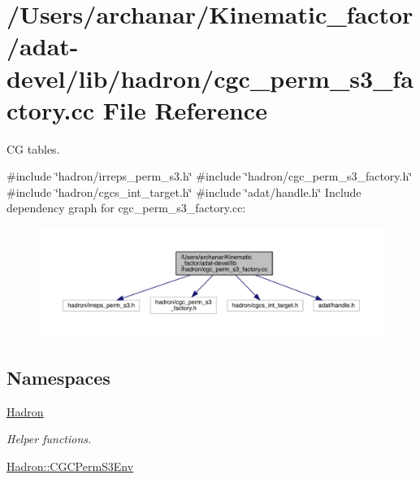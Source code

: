 \hypertarget{adat-devel_2lib_2hadron_2cgc__perm__s3__factory_8cc}{}\section{/\+Users/archanar/\+Kinematic\+\_\+factor/adat-\/devel/lib/hadron/cgc\+\_\+perm\+\_\+s3\+\_\+factory.cc File Reference}
\label{adat-devel_2lib_2hadron_2cgc__perm__s3__factory_8cc}


CG tables.  


{\ttfamily \#include \char`\"{}hadron/irreps\+\_\+perm\+\_\+s3.\+h\char`\"{}}\newline
{\ttfamily \#include \char`\"{}hadron/cgc\+\_\+perm\+\_\+s3\+\_\+factory.\+h\char`\"{}}\newline
{\ttfamily \#include \char`\"{}hadron/cgcs\+\_\+int\+\_\+target.\+h\char`\"{}}\newline
{\ttfamily \#include \char`\"{}adat/handle.\+h\char`\"{}}\newline
Include dependency graph for cgc\+\_\+perm\+\_\+s3\+\_\+factory.\+cc\+:
\nopagebreak
\begin{figure}[H]
\begin{center}
\leavevmode
\includegraphics[width=350pt]{dd/d3c/adat-devel_2lib_2hadron_2cgc__perm__s3__factory_8cc__incl}
\end{center}
\end{figure}
\subsection*{Namespaces}
\begin{DoxyCompactItemize}
\item 
 \mbox{\hyperlink{namespaceHadron}{Hadron}}
\begin{DoxyCompactList}\small\item\em Helper functions. \end{DoxyCompactList}\item 
 \mbox{\hyperlink{namespaceHadron_1_1CGCPermS3Env}{Hadron\+::\+C\+G\+C\+Perm\+S3\+Env}}
\end{DoxyCompactItemize}
